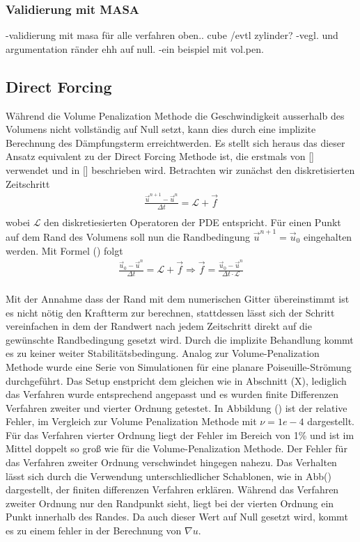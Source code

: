 \subsubsection{Validierung mit MASA}
-validierung mit masa für alle verfahren oben.. cube /evtl zylinder?
-vegl. und argumentation ränder ehh auf null.
-ein beispiel mit vol.pen.

\subsection{Direct Forcing}
Während die Volume Penalization Methode die Geschwindigkeit ausserhalb des Volumens nicht vollständig auf Null setzt,
 kann dies durch eine implizite Berechnung des Dämpfungsterm erreichtwerden. Es stellt sich heraus das dieser Ansatz equivalent
  zu der Direct Forcing Methode ist, die erstmals von [] verwendet und in [] beschrieben wird.
Betrachten wir zunächst den diskretisierten Zeitschritt
\begin{align}
    \frac{\vec{u}^{n+1} -\vec{u}^n}{\Delta t} = \mathscr{L} + \vec{f}\\
\end{align}
wobei $\mathscr{L}$ den diskretiesierten Operatoren der PDE entspricht.
Für einen Punkt auf dem Rand des Volumens soll nun die Randbedingung $\vec{u}^{n+1} = \vec{u}_0$ eingehalten werden.
Mit Formel () folgt
\begin{align}
    \frac{\vec{u}_0 -\vec{u}^n}{\Delta t} = \mathscr{L} + \vec{f} \Rightarrow \vec{f} = \frac{\vec{u}_0 -\vec{u}^n}{\Delta t\cdot \mathscr{L}}\\
\end{align}

Mit der Annahme dass der Rand mit dem numerischen Gitter übereinstimmt ist es nicht nötig den Kraftterm zur berechnen, stattdessen lässt sich der
Schritt vereinfachen in dem der Randwert nach  jedem Zeitschritt direkt auf die gewünschte Randbedingung gesetzt wird. Durch die
implizite Behandlung kommt es zu keiner weiter Stabilitätsbedingung.
Analog zur Volume-Penalization Methode wurde eine Serie von Simulationen für eine planare Poiseuille-Strömung durchgeführt.
Das Setup enstpricht dem gleichen wie in Abschnitt (X), lediglich das Verfahren wurde entsprechend angepasst und es wurden finite Differenzen Verfahren zweiter und
vierter Ordnung getestet.
In Abbildung () ist der relative Fehler, im Vergleich zur Volume Penalization  Methode mit $\nu=1e-4$ dargestellt.
Für das Verfahren vierter Ordnung liegt der Fehler im Bereich von 1\% und ist im Mittel doppelt so groß wie für die Volume-Penalization Methode.
Der Fehler für das Verfahren zweiter Ordnung verschwindet hingegen nahezu.
Das Verhalten lässt sich durch die Verwendung unterschliedlicher Schablonen, wie in Abb() dargestellt,  der finiten differenzen Verfahren erklären.
Während das Verfahren zweiter Ordnung nur den Randpunkt sieht, liegt bei der vierten Ordnung ein Punkt innerhalb des Randes.
Da auch dieser Wert auf Null gesetzt wird, kommt es zu einem fehler in der Berechnung von $\nabla u$.
